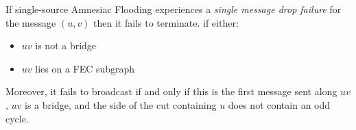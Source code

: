    \begin{*theorem}
    \label{thm:message drop}
        If single-source Amnesiac Flooding experiences a \emph{single message drop failure} for the message $(u,v)$ then it fails to 
       terminate.
        if either:
        \begin{itemize}
            \item $uv$ is not a bridge
            \item $uv$ lies on a FEC subgraph
        \end{itemize}
        Moreover, it fails to broadcast if and only if this is the first message sent along $uv$, $uv$ is a bridge, and the side of the cut containing $u$ does not contain an odd cycle.
    \end{*theorem}